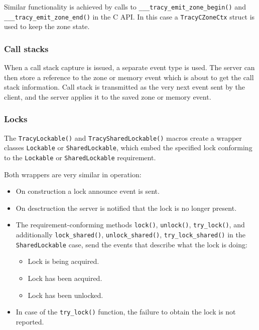 \documentclass[hidelinks,titlepage,a4paper]{article}
\begin{document}
Similar functionality is achieved by calls to \texttt{\_\_\_tracy\_emit\_zone\_begin()} and \texttt{\_\_\_tracy\_emit\_zone\_end()} in the C API. In this case a \texttt{TracyCZoneCtx} struct is used to keep the zone state.

\subsubsection{Call stacks}

When a call stack capture is issued, a separate event type is used. The server can then store a reference to the zone or memory event which is about to get the call stack information. Call stack is transmitted as the very next event sent by the client, and the server applies it to the saved zone or memory event.

\subsubsection{Locks}

The \texttt{TracyLockable()} and \texttt{TracySharedLockable()} macros create a wrapper classes \texttt{Lockable} or \texttt{SharedLockable}, which embed the specified lock conforming to the \texttt{Lockable} or \texttt{SharedLockable} requirement.

Both wrappers are very similar in operation:

\begin{itemize}
\item On construction a lock announce event is sent.
\item On desctruction the server is notified that the lock is no longer present.
\item The requirement-conforming methods \texttt{lock()}, \texttt{unlock()}, \texttt{try\_lock()}, and additionally \texttt{lock\_shared()}, \texttt{unlock\_shared()}, \texttt{try\_lock\_shared()} in the \texttt{SharedLockable} case, send the events that describe what the lock is doing:
\begin{itemize}
\item Lock is being acquired.
\item Lock has been acquired.
\item Lock has been unlocked.
\end{itemize}
\item In case of the \texttt{try\_lock()} function, the failure to obtain the lock is not reported.
\end{itemize}
\end{document}
